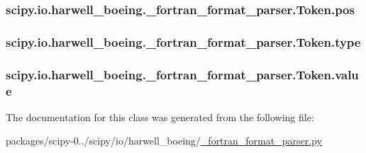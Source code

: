 \subsubsection[{pos}]{\setlength{\rightskip}{0pt plus 5cm}scipy.\+io.\+harwell\+\_\+boeing.\+\_\+fortran\+\_\+format\+\_\+parser.\+Token.\+pos}\label{classscipy_1_1io_1_1harwell__boeing_1_1__fortran__format__parser_1_1Token_ac541cd20b6f5c3c0e0ab08dabcbe00f3}
\hypertarget{classscipy_1_1io_1_1harwell__boeing_1_1__fortran__format__parser_1_1Token_a40e88c474d6f2e754ada29327116e40a}{}
\subsubsection[{type}]{\setlength{\rightskip}{0pt plus 5cm}scipy.\+io.\+harwell\+\_\+boeing.\+\_\+fortran\+\_\+format\+\_\+parser.\+Token.\+type}\label{classscipy_1_1io_1_1harwell__boeing_1_1__fortran__format__parser_1_1Token_a40e88c474d6f2e754ada29327116e40a}
\hypertarget{classscipy_1_1io_1_1harwell__boeing_1_1__fortran__format__parser_1_1Token_a6785aa6fb6aeb32287b7796d31ea514b}{}
\subsubsection[{value}]{\setlength{\rightskip}{0pt plus 5cm}scipy.\+io.\+harwell\+\_\+boeing.\+\_\+fortran\+\_\+format\+\_\+parser.\+Token.\+value}\label{classscipy_1_1io_1_1harwell__boeing_1_1__fortran__format__parser_1_1Token_a6785aa6fb6aeb32287b7796d31ea514b}


The documentation for this class was generated from the following file\+:\begin{DoxyCompactItemize}
\item 
packages/scipy-\/0../scipy/io/harwell\+\_\+boeing/\hyperlink{__fortran__format__parser_8py}{\+\_\+fortran\+\_\+format\+\_\+parser.\+py}\end{DoxyCompactItemize}
